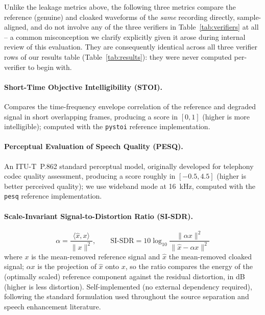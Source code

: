 \documentclass[11pt]{article}
\begin{document}
Unlike the leakage metrics above, the following three metrics compare
the reference (genuine) and cloaked waveforms of the \emph{same}
recording directly, sample-aligned, and do not involve any of the
three verifiers in Table~\ref{tab:verifiers} at all -- a common
misconception we clarify explicitly given it arose during internal
review of this evaluation. They are consequently identical across all
three verifier rows of our results table (Table~\ref{tab:results}):
they were never computed per-verifier to begin with.

\paragraph{Short-Time Objective Intelligibility (STOI).} Compares the
time-frequency envelope correlation of the reference and degraded
signal in short overlapping frames, producing a score in
$[0,1]$ (higher is more intelligible); computed with the
\texttt{pystoi} reference implementation.

\paragraph{Perceptual Evaluation of Speech Quality (PESQ).} An
ITU-T~P.862 standard perceptual model, originally developed for
telephony codec quality assessment, producing a score roughly in
$[-0.5, 4.5]$ (higher is better perceived quality); we use wideband
mode at 16~kHz, computed with the \texttt{pesq} reference
implementation.

\paragraph{Scale-Invariant Signal-to-Distortion Ratio (SI-SDR).}
\begin{equation}
\alpha = \frac{\langle \hat{x}, x \rangle}{\lVert x \rVert^2}, \qquad
\mathrm{SI\text{-}SDR} = 10 \log_{10}
  \frac{\lVert \alpha x \rVert^2}{\lVert \hat{x} - \alpha x \rVert^2}
\end{equation}
where $x$ is the mean-removed reference signal and $\hat{x}$ the
mean-removed cloaked signal; $\alpha x$ is the projection of $\hat{x}$
onto $x$, so the ratio compares the energy of the (optimally scaled)
reference component against the residual distortion, in dB (higher is
less distortion). Self-implemented (no external dependency required),
following the standard formulation used throughout the source
separation and speech enhancement literature.
\end{document}
